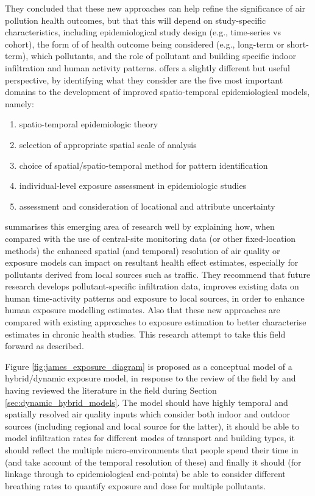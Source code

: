 They concluded that these new approaches can help refine the significance of air pollution health outcomes, but that this will depend on study-specific characteristics, including epidemiological study design (e.g., time-series vs cohort), the form of of health outcome being considered (e.g., long-term or short-term), which pollutants, and the role of pollutant and building specific indoor infiltration and human activity patterns. \cite{Meliker2011} offers a slightly different but useful perspective, by identifying what they consider are the five most important domains to the development of improved spatio-temporal epidemiological models, namely:

\begin{enumerate}
  \item spatio-temporal epidemiologic theory
  \item selection of appropriate spatial scale of analysis
  \item choice of spatial/spatio-temporal method for pattern identification
  \item individual-level exposure assessment in epidemiologic studies
  \item assessment and consideration of locational and attribute uncertainty
\end{enumerate}

\cite{Baxter2013} summarises this emerging area of research well by explaining how, when compared with the use of central-site monitoring data (or other fixed-location methods) the enhanced spatial (and temporal) resolution of air quality or exposure models can impact on resultant health effect estimates, especially for pollutants derived from local sources such as traffic.  They recommend that future research develops pollutant-specific infiltration data, improves existing data on human time-activity patterns and exposure to local sources, in order to enhance human exposure modelling estimates. Also that these new approaches are compared with existing approaches to exposure estimation to better characterise estimates in chronic health studies. This research attempt to take this field forward as described.

Figure \ref{fig:james_exposure_diagram} is proposed as a conceptual model of a hybrid/dynamic exposure model, in response to the review of the field by \cite{Baxter2013} and having reviewed the literature in the field during Section \ref{sec:dynamic_hybrid_models}. The model should have highly temporal and spatially resolved air quality inputs which consider both indoor and outdoor sources (including regional and local source for the latter), it should be able to model infiltration rates for different modes of transport and building types, it should reflect the multiple micro-environments that people spend their time in (and take account of the temporal resolution of these) and finally it should (for linkage through to epidemiological end-points) be able to consider different breathing rates to quantify exposure and dose for multiple pollutants.

